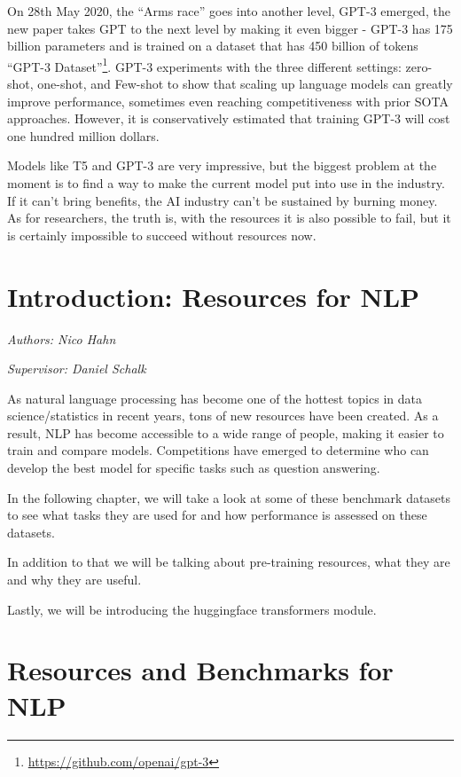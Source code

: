 \documentclass[]{krantz}
\renewcommand{\href}[2]{#2\footnote{\url{#1}}}
\begin{document}
On 28th May 2020, the ``Arms race'' goes into another level, GPT-3 \citet{brown2020language} emerged, the new paper takes GPT to the next level by making it even bigger - GPT-3 has 175 billion parameters and is trained on a dataset that has 450 billion of tokens \href{https://github.com/openai/gpt-3}{``GPT-3 Dataset''}. GPT-3 experiments with the three different settings: zero-shot, one-shot, and Few-shot to show that scaling up language models can greatly improve performance, sometimes even reaching competitiveness with prior SOTA approaches. However, it is conservatively estimated that training GPT-3 will cost one hundred million dollars.

Models like T5 and GPT-3 are very impressive, but the biggest problem at the moment is to find a way to make the current model put into use in the industry. If it can't bring benefits, the AI industry can't be sustained by burning money. As for researchers, the truth is, with the resources it is also possible to fail, but it is certainly impossible to succeed without resources now.

\hypertarget{introduction-resources-for-nlp}{%
\chapter{Introduction: Resources for NLP}\label{introduction-resources-for-nlp}}

\emph{Authors: Nico Hahn}

\emph{Supervisor: Daniel Schalk}

As natural language processing has become one of the hottest topics in data science/statistics in recent years, tons of new resources have been created. As a result, NLP has become accessible to a wide range of people, making it easier to train and compare models. Competitions have emerged to determine who can develop the best model for specific tasks such as question answering.

In the following chapter, we will take a look at some of these benchmark datasets to see what tasks they are used for and how performance is assessed on these datasets.

In addition to that we will be talking about pre-training resources, what they are and why they are useful.

Lastly, we will be introducing the huggingface transformers module.

\hypertarget{resources-and-benchmarks-for-nlp}{%
\chapter{Resources and Benchmarks for NLP}\label{resources-and-benchmarks-for-nlp}}
\end{document}
